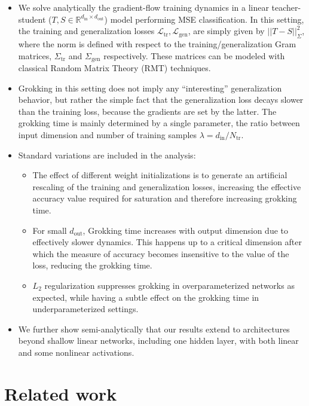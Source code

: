 \documentclass[a4paper,11pt]{article}
\newcommand{\dout}{d_\mathrm{out}}
\newcommand{\din}{d_\mathrm{in}}
\newcommand{\training}{\mathrm{tr}}
\newcommand{\gen}{\mathrm{gen}}
\begin{document}
\begin{itemize}
    \item We solve analytically the gradient-flow training dynamics in a linear teacher-student ($T, S \in \mathbb{R}^{\din\times \dout}$) model performing MSE classification. In this setting, the training and generalization losses $\mathcal{L}_\training, \mathcal{L}_\gen$, are simply given by $||T-S||^2_{\Sigma}$, where the norm is defined with respect to the training/generalization Gram matrices, $\Sigma_{\mathrm{tr}}$ and $\Sigma_{\mathrm{gen}}$ respectively. These matrices can be modeled with classical Random Matrix Theory (RMT) techniques.
    \item Grokking in this setting does not imply any ``interesting''  generalization behavior, but rather the simple fact that the generalization loss decays slower than the training loss, because the gradients are set by the latter. The grokking time is mainly determined by a single parameter, the ratio between input dimension and number of training samples $\lambda=\din/N_\training$.
    \item Standard variations are included in the analysis:
    \begin{itemize}
     \item The effect of different weight initializations is to generate an artificial rescaling of the training and generalization losses, increasing the effective accuracy value required for saturation and therefore increasing grokking time.
    \item For small $\dout$, Grokking time increases with output dimension due to effectively slower dynamics. This happens up to a critical dimension after which the measure of accuracy becomes insensitive to the value of the loss, reducing the grokking time.
    \item $L_2$ regularization suppresses grokking in overparameterized networks as expected, while having a subtle effect on the grokking time in underparameterized settings. 
    \end{itemize}
    \item We further show semi-analytically that our results extend to architectures beyond shallow linear networks, including one hidden layer, with both linear and some nonlinear activations.
\end{itemize}
\section{Related work}
\end{document}
